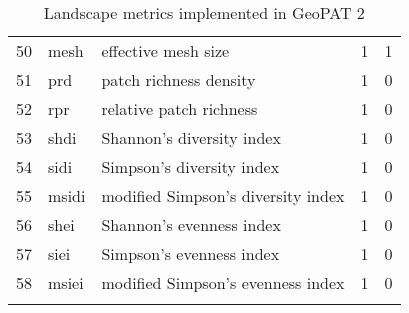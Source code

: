 \begin{longtable}{rllrr}
   50 & mesh & effective mesh size &   1 &   1 \\ 
   51 & prd & patch richness density &   1 &   0 \\ 
   52 & rpr & relative patch richness &   1 &   0 \\ 
   53 & shdi & Shannon's diversity index &   1 &   0 \\ 
   54 & sidi & Simpson's diversity index &   1 &   0 \\ 
   55 & msidi & modified Simpson's diversity index &   1 &   0 \\ 
   56 & shei & Shannon's evenness index &   1 &   0 \\ 
   57 & siei & Simpson's evenness index &   1 &   0 \\ 
   58 & msiei & modified Simpson's evenness index &   1 &   0 \\ 
  \hline
\caption{Landscape metrics implemented in GeoPAT 2} 
\label{lindtable}
\end{longtable}
